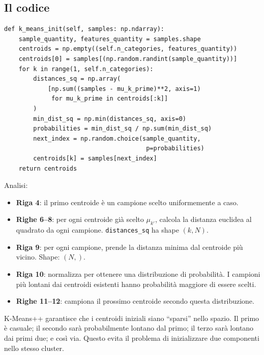 \documentclass[11pt,a4paper]{article}
\begin{document}
\subsection{Il codice}

\begin{lstlisting}[caption={K-Means++ initialization}]
def k_means_init(self, samples: np.ndarray):
    sample_quantity, features_quantity = samples.shape
    centroids = np.empty((self.n_categories, features_quantity))
    centroids[0] = samples[(np.random.randint(sample_quantity))]
    for k in range(1, self.n_categories):
        distances_sq = np.array(
            [np.sum((samples - mu_k_prime)**2, axis=1)
             for mu_k_prime in centroids[:k]]
        )
        min_dist_sq = np.min(distances_sq, axis=0)
        probabilities = min_dist_sq / np.sum(min_dist_sq)
        next_index = np.random.choice(sample_quantity,
                                       p=probabilities)
        centroids[k] = samples[next_index]
    return centroids
\end{lstlisting}

Analisi:
\begin{itemize}
  \item \textbf{Riga 4}: il primo centroide è un campione scelto
        uniformemente a caso.
  \item \textbf{Righe 6--8}: per ogni centroide già scelto $\mu_{k'}$,
        calcola la distanza euclidea al quadrato da ogni campione.
        \texttt{distances\_sq} ha shape $(k, N)$.
  \item \textbf{Riga 9}: per ogni campione, prende la distanza minima
        dal centroide più vicino. Shape: $(N,)$.
  \item \textbf{Riga 10}: normalizza per ottenere una distribuzione
        di probabilità. I campioni più lontani dai centroidi esistenti
        hanno probabilità maggiore di essere scelti.
  \item \textbf{Righe 11--12}: campiona il prossimo centroide secondo
        questa distribuzione.
\end{itemize}

\begin{tipbox}
K-Means++ garantisce che i centroidi iniziali siano ``sparsi'' nello
spazio. Il primo è casuale; il secondo sarà probabilmente lontano dal
primo; il terzo sarà lontano dai primi due; e così via. Questo evita
il problema di inizializzare due componenti nello stesso cluster.
\end{tipbox}
\end{document}
